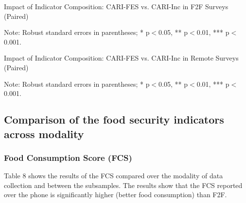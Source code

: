\documentclass[11pt,harvard]{article}
\begin{document}
\begin{table}[htbp]
	\centering
	\begin{adjustbox}{max width=\textwidth}
		\begin{threeparttable}
			\caption{Impact of Indicator Composition: CARI-FES vs. CARI-Inc in F2F Surveys (Paired)}
			\scriptsize
			 
			\label{tab:CAR_F2F_Paired_ttest}
			\begin{tablenotes}
				\item Note: Robust standard errors in parentheses; * p$<$0.05, ** p$<$0.01, *** p$<$0.001.
			\end{tablenotes}
		\end{threeparttable}
	\end{adjustbox}
\end{table}



\begin{table}[htbp]
	\centering
	\begin{adjustbox}{max width=\textwidth}
		\begin{threeparttable}
			\caption{Impact of Indicator Composition: CARI-FES vs. CARI-Inc in Remote Surveys (Paired)}
			\scriptsize
			 
			\label{tab:CAR_RM_Paired_ttest}
			\begin{tablenotes}
				\item Note: Robust standard errors in parentheses; * p$<$0.05, ** p$<$0.01, *** p$<$0.001. 
			\end{tablenotes}
		\end{threeparttable}
	\end{adjustbox}
\end{table}


\pagebreak


\subsection{Comparison of the food security indicators across modality} 


\subsubsection{Food Consumption Score (FCS)}
	
Table 8 shows the results of the FCS compared over the modality of data collection and between the subsamples. The results show that the FCS reported over the phone is significantly higher (better food consumption) than F2F.  
\end{document}
